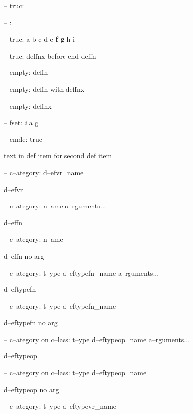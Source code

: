 \documentclass{book}
\begin{document}
\begin{titlepage}
%
\hbox{}-- truc: 


\hbox{}-- : 


\hbox{}-- truc: a b c d e \textbf{f g} h i


%
\hbox{}-- truc: deffnx before end deffn


%


\hbox{}-- empty: deffn


%

\hbox{}-- empty: deffn with deffnx


%
\hbox{}-- empty: deffnx


%

\hbox{}-- fset: \emph{i} a g


%
\hbox{}-- cmde: truc 


%
text in def item for second def item


\hbox{}-- c--ategory: d--efvr\_name


%
d--efvr

\hbox{}-- c--ategory: n--ame a--rguments...


%
d--effn

\hbox{}-- c--ategory: n--ame


%
d--effn no arg

\hbox{}-- c--ategory: t--ype d--eftypefn\_name a--rguments...


%
d--eftypefn

\hbox{}-- c--ategory: t--ype d--eftypefn\_name


%
d--eftypefn no arg

\hbox{}-- c--ategory on c--lass: t--ype d--eftypeop\_name a--rguments...


%
d--eftypeop

\hbox{}-- c--ategory on c--lass: t--ype d--eftypeop\_name


%
d--eftypeop no arg

\hbox{}-- c--ategory: t--ype d--eftypevr\_name



\end{titlepage}
\end{document}
